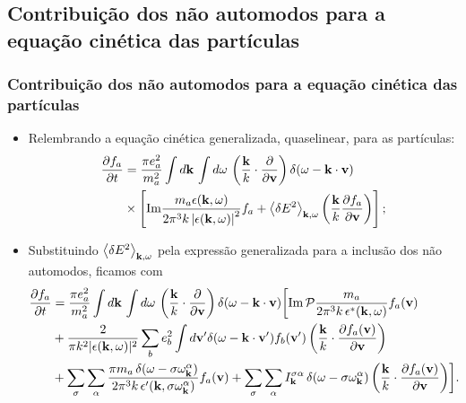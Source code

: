 \documentclass[10pt,aspectratio=1610,lualatex]{beamer}
\begin{document}
\subsection{Contribuição dos não automodos para a equação
  cinética das partículas}
\begin{frame}
  \frametitle{Contribuição dos não automodos para a equação
    cinética
    das partículas}
  \begin{itemize}
    \item Relembrando a equação cinética generalizada, quaselinear,
    para as partículas:
    \begin{equation*}
      \begin{split}
	\frac{\partial f_a}{\partial t} &=\frac{\pi e_a^2}{m_a^2}
        \int d{\bf k}\,\int d\omega\, \left( \frac{\bf k}{k}\cdot
	\frac{\partial}{\partial {\bf v}}\right)
	\delta(\omega -{\bf k \cdot v})\\
	&\times\left[\mbox{Im} \frac{m_a \epsilon({\bf k},\omega)}
	  {2\pi^3k \left|\epsilon ({\bf k},\omega) \right|^2 } f_a
	  +\left<\delta E^2\right>_{{\bf k},\omega}\left(
            \frac{\bf k}{k} \frac{\partial f_a}{\partial \bf v}
          \right)\right];
      \end{split}
    \end{equation*}\pause
    \item Substituindo $\left< \delta E^2 \right>_{{\bf k},\omega}$
    pela expressão generalizada para a inclusão dos não automodos,
    ficamos com
    \begin{equation*}
      \begin{split}
        \frac{\partial f_a}{\partial t}
	&=\frac{\pi e_a^2}{m_a^2} \int d{\bf k}\, \int d\omega\,
	\left( \frac{\bf k}{k}\cdot \frac{\partial}{\partial {\bf v}}
	\right) \delta(\omega-{\bf k \cdot v}) \biggl[\mbox{Im}\,
	\mathcal{P} \frac{m_a}{2\pi^3k\, \epsilon^*({\bf k},\omega)}
	f_a({\bf v})\\
	&+\frac{2}{\pi k^2|\epsilon({\bf k},\omega)|^2} \sum_b
	e_b^2\int d{\bf v'} \delta(\omega-{\bf k\cdot v'})
	f_b({\bf v '})\left( \frac{\bf k}{k}\cdot
	  \frac{\partial f_a({\bf v})}{\partial {\bf v}}\right)\\
	&+\sum_\sigma\sum_\alpha
	\frac{\pi m_a\,\delta(\omega-\sigma\omega_{\bf k}^\alpha)}
	{2\pi^3 k\, \epsilon '({\bf k},\sigma\omega_{\bf k}^\alpha)}
	f_a({\bf v}) +\sum_\sigma\sum_\alpha I_{\bf k}^{\sigma \alpha}\,
	\delta(\omega-\sigma\omega_{\bf k}^\alpha)
	\left(\frac{\bf k}{k}\cdot
       \frac{\partial f_a({\bf v})}{\partial {\bf v}}\right)\biggr].
      \end{split}
    \end{equation*}
  \end{itemize}
\end{frame}
\end{document}
